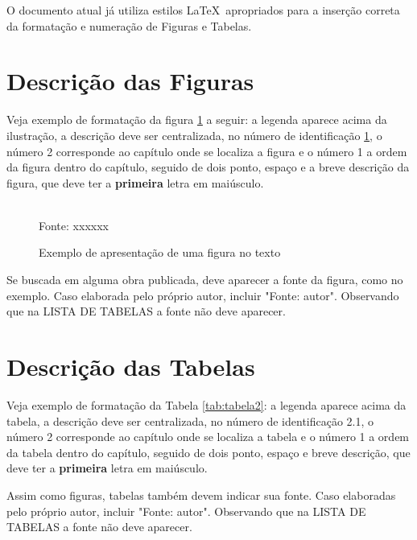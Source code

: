 \documentclass[rel_mlp]{iiufrgs}
\newcommand{\fonte}[1]{\\Fonte: {#1}}
\begin{document}
O documento atual já utiliza estilos \LaTeX\ apropriados para a inserção correta da formatação e numeração de Figuras e Tabelas. 


\section{Descrição das Figuras}

Veja exemplo de formatação da figura \ref{fig:figura1} a seguir: a legenda aparece acima da ilustração, a descrição deve ser centralizada, no número de identificação  \ref{fig:figura1}, o número 2 corresponde ao capítulo onde se localiza a figura e o número 1 a ordem da figura dentro do capítulo, seguido de dois ponto, espaço e a breve descrição da figura, que deve ter a {\bf primeira} letra em maiúsculo.


\begin{figure}[htb]
    \centering
    \caption{Exemplo de apresentação de uma figura no texto}
    \label{fig:figura1}
    \fonte{xxxxxx}
\end{figure}


Se  buscada em alguma obra publicada, deve aparecer a fonte da figura, como no exemplo. Caso elaborada pelo próprio autor, incluir "Fonte: autor". Observando que na LISTA DE TABELAS a fonte não deve aparecer. 



\section{Descrição das Tabelas}

Veja exemplo de formatação da Tabela \ref{tab:tabela2}: a legenda aparece acima da tabela, a descrição deve ser centralizada, no número de identificação 2.1, o número 2 corresponde ao capítulo onde se localiza a tabela e o número 1 a ordem da tabela dentro do capítulo, seguido de dois ponto, espaço e  breve descrição, que deve ter a {\bf primeira} letra em maiúsculo. 

Assim como figuras, tabelas também devem indicar sua fonte. Caso elaboradas pelo próprio autor, incluir "Fonte: autor". Observando que na LISTA DE TABELAS a fonte não deve aparecer. 
\end{document}
